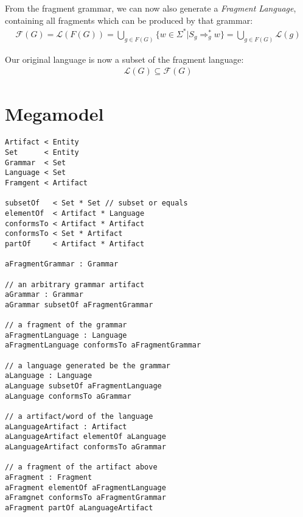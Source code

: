 \documentclass[runningheads,a4paper]{llncs}
\begin{document}
From the fragment grammar, we can now also generate a \textit{Fragment Language}, containing all fragments which can be produced by that grammar:
\begin{align*}
\mathcal{F}(G) 
= \mathcal{L}(F(G))
= \bigcup\limits_{g \in F(G)} \{ w \in \Sigma^* | S_g \Rightarrow_{g}^* w \}
= \bigcup\limits_{g \in F(G)} \mathcal{L}(g)
\end{align*}

Our original language is now a subset of the fragment language:
\begin{align*}
\mathcal{L}(G) \subseteq \mathcal{F}(G) 
\end{align*}

\section*{Megamodel}

\begin{lstlisting}[basicstyle=\small\ttfamily]
Artifact < Entity
Set      < Entity
Grammar  < Set
Language < Set
Framgent < Artifact

subsetOf   < Set * Set // subset or equals
elementOf  < Artifact * Language
conformsTo < Artifact * Artifact
conformsTo < Set * Artifact
partOf     < Artifact * Artifact

aFragmentGrammar : Grammar

// an arbitrary grammar artifact
aGrammar : Grammar
aGrammar subsetOf aFragmentGrammar

// a fragment of the grammar
aFragmentLanguage : Language
aFragmentLanguage conformsTo aFragmentGrammar

// a language generated be the grammar
aLanguage : Language
aLanguage subsetOf aFragmentLanguage
aLanguage conformsTo aGrammar

// a artifact/word of the language
aLanguageArtifact : Artifact
aLanguageArtifact elementOf aLanguage
aLanguageArtifact conformsTo aGrammar

// a fragment of the artifact above
aFragment : Fragment
aFragment elementOf aFragmentLanguage
aFramgnet conformsTo aFragmentGrammar
aFragment partOf aLanguageArtifact
\end{lstlisting}
\end{document}

